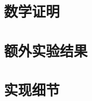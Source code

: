 \documentclass[conference]{IEEEtran}
\begin{document}
\begin{CJK}{UTF8}{gbsn}
\appendix

\section{数学证明}
\label{app:proofs}


\section{额外实验结果}
\label{app:results}


\section{实现细节}
\label{app:implementation}


\end{CJK}
\end{document}
